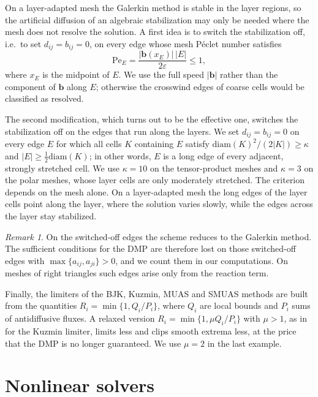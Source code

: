 \documentclass[11pt,a4paper]{article}
\newcommand{\eps}{\varepsilon}
\newcommand{\bb}{\boldsymbol{b}}
\theoremstyle{remark}
\newtheorem{remark}{Remark}[section]
\begin{document}
On a layer-adapted mesh the Galerkin method is stable in the layer regions, so the artificial diffusion of an
algebraic stabilization may only be needed where the mesh does not resolve the solution. A first idea is to switch
the stabilization off, i.e.\ to set $d_{ij}=b_{ij}=0$, on every edge whose mesh P\'eclet number satisfies
\begin{equation}\label{eq:pe}
  \mathrm{Pe}_E=\frac{|\bb(x_E)|\,|E|}{2\eps}\le1,
\end{equation}
where $x_E$ is the midpoint of $E$. We use the full speed $|\bb|$ rather than the component of $\bb$ along $E$;
otherwise the crosswind edges of coarse cells would be classified as resolved.

The second modification, which turns out to be the effective one, switches the stabilization off on the edges that
run along the layers. We set $d_{ij}=b_{ij}=0$ on every edge $E$ for which all cells $K$ containing $E$ satisfy
$\mathrm{diam}(K)^2/(2|K|)\ge\kappa$ and $|E|\ge\frac12\mathrm{diam}(K)$; in other words, $E$ is a long edge of every
adjacent, strongly stretched cell. We use $\kappa=10$ on the tensor-product meshes and $\kappa=3$ on the polar meshes,
whose layer cells are only moderately stretched. The criterion depends on the mesh alone. On a layer-adapted mesh the
long edges of the layer cells point along the layer, where the solution varies slowly, while the edges across the
layer stay stabilized.

\begin{remark}
On the switched-off edges the scheme reduces to the Galerkin method. The sufficient conditions for the DMP are
therefore lost on those switched-off edges with $\max\{a_{ij},a_{ji}\}>0$, and we count them in our computations. On
meshes of right triangles such edges arise only from the reaction term.
\end{remark}

Finally, the limiters of the BJK, Kuzmin, MUAS and SMUAS methods are built from the quantities
$R_i=\min\{1,Q_i/P_i\}$, where $Q_i$ are local bounds and $P_i$ sums of antidiffusive fluxes. A relaxed version
$R_i=\min\{1,\mu Q_i/P_i\}$ with $\mu>1$, as in \cite[(27)]{Kno23} for the Kuzmin limiter, limits less and clips
smooth extrema less, at the price that the DMP is no longer guaranteed. We use $\mu=2$ in the last example.

\section{Nonlinear solvers}\label{sec:solvers}
\end{document}

